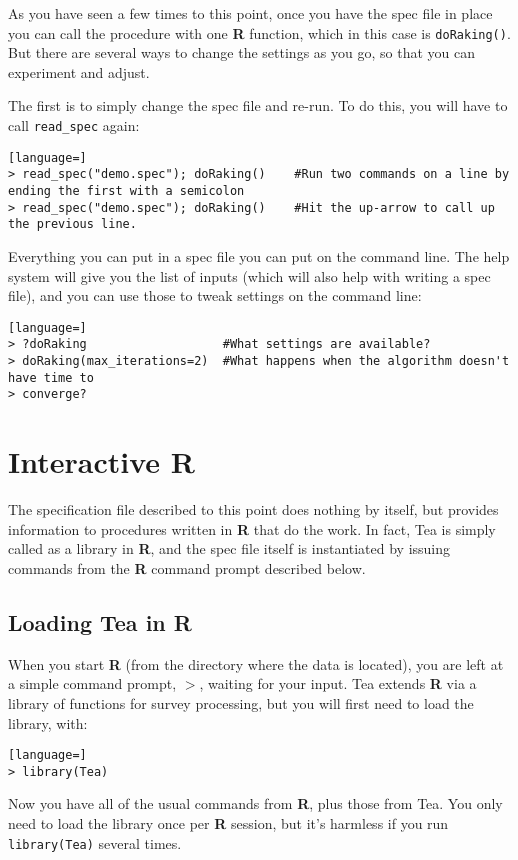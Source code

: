 \documentclass{article}
\begin{document}
{As you have seen a few times to this point, once you have the spec file in place you can
call the procedure with one \textbf{R} function, which in this case is {\tt doRaking()}. But there
are several ways to change the settings as you go, so that you can experiment and adjust.

The first is to simply change the spec file and re-run. To do this, you will have to call
{\tt read\_spec} again:
\begin{lstlisting}[language=]
> read_spec("demo.spec"); doRaking()    #Run two commands on a line by ending the first with a semicolon
> read_spec("demo.spec"); doRaking()    #Hit the up-arrow to call up the previous line.
\end{lstlisting}

Everything you can put in a spec file you can put on the command line. The help system
will give you the list of inputs (which will also help with writing a spec file), and you
can use those to tweak settings on the command line:
\begin{lstlisting}[language=]
> ?doRaking                   #What settings are available?
> doRaking(max_iterations=2)  #What happens when the algorithm doesn't have time to
> converge?
\end{lstlisting}
} %


\section{Interactive R}\label{rsec}
The specification file described to this point does nothing by itself, but provides
information to procedures written in \textbf{R} that do the work. In fact, Tea is simply 
called as a library in \textbf{R}, and the spec file itself is instantiated by 
issuing commands from the \textbf{R} command prompt described below.

\subsection{Loading Tea in R}
When you start \textbf{R} (from the directory where the data is located), you are left at a
simple command prompt, $>$, waiting for your input. Tea extends \textbf{R} via a library of
functions for survey processing, but you will first need to load the library, with:
\begin{lstlisting}[language=]
> library(Tea)
\end{lstlisting}

Now you have all of the usual commands from \textbf{R}, plus those from Tea. You only
need to load the library once per \textbf{R} session, but it's harmless if you run
{\tt library(Tea)} several times.
\end{document}
